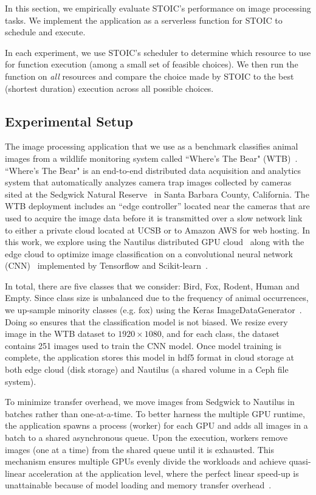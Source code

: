 In this section, we empirically evaluate STOIC's performance on image processing tasks. We implement the application as a serverless function for STOIC to schedule and execute.

In each experiment, we use STOIC's scheduler to determine which resource to use for function execution (among a small set of feasible choices). We then run the function on \textit{all} resources and compare the choice made by STOIC to the best (shortest duration) execution across all possible choices.

\subsection{Experimental Setup}

The image processing application that we use as a benchmark classifies animal images from a wildlife monitoring system called ``Where's The Bear" (WTB)~\cite{ref:wtb}. ``Where's The Bear" is an end-to-end distributed data acquisition and analytics system that automatically analyzes camera trap images collected by cameras sited at the Sedgwick Natural Reserve~\cite{ref:sedgwick} in Santa Barbara County, California. The WTB deployment includes an ``edge controller'' located near the cameras that are used to acquire the image data before it is transmitted over a slow network link to either a private cloud located at UCSB or to Amazon AWS for web hosting. In this work, we explore using the Nautilus distributed GPU cloud~\cite{ref:nautilus} along with the edge cloud to optimize image classification on a convolutional neural network (CNN)~\cite{ref:cnn} implemented by Tensorflow and Scikit-learn~\cite{ref:scikit}. 

In total, there are five classes that we consider: Bird, Fox, Rodent, Human and Empty. Since class size is unbalanced due to the frequency of animal occurrences, we up-sample minority classes (e.g. fox) using the Keras ImageDataGenerator~\cite{ref:keras}. Doing so ensures that the classification model is not biased. We resize every image in the WTB dataset to $1920 \times 1080$, and for each class, the dataset contains 251 images used to train the CNN model. Once model training is complete, the application stores this model in hdf5 format in cloud storage at both edge cloud (disk storage) and Nautilus (a shared volume in a Ceph file system). 

To minimize transfer overhead, we move images from Sedgwick to Nautilus in batches rather than one-at-a-time. To better harness the multiple GPU runtime, the application spawns a process (worker) for each GPU and adds all images in a batch to a shared asynchronous queue. Upon the execution, workers remove images (one at a time) from the shared queue until it is exhausted. This mechanism ensures multiple GPUs evenly divide the workloads and achieve quasi-linear acceleration at the application level, where the perfect linear speed-up is unattainable because of model loading and memory transfer overhead~\cite{ref:multi_gpu}. 


